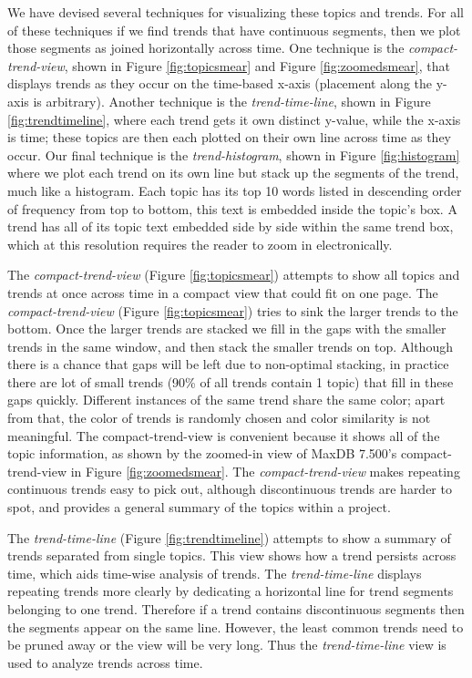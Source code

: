 \documentclass[times, 10pt,twocolumn]{article}
\begin{document}
We have devised several techniques for visualizing these topics and
trends.  For all of these techniques if we find trends that have
continuous segments, then we plot those segments as joined
horizontally across time. One technique is the \emph{compact-trend-view},
shown in Figure \ref{fig:topicsmear} and Figure \ref{fig:zoomedsmear},
that displays trends as they occur on the time-based x-axis
(placement along the y-axis is arbitrary).  Another technique is
the \emph{trend-time-line}, shown in Figure \ref{fig:trendtimeline}, where
each trend gets it own distinct y-value, while the x-axis is time;
these topics are then each plotted on their own line across time as
they occur. Our final technique is the \emph{trend-histogram}, shown in Figure
\ref{fig:histogram} where we plot each trend on its own line but stack
up the segments of the trend, much like a histogram. Each topic has its top 10 words 
listed in descending order of frequency from top to bottom, this text is embedded inside the topic's box.
A trend has all of its topic text embedded side by side within the same trend box, which at this resolution requires the reader to zoom in electronically.


 The \emph{compact-trend-view} (Figure \ref{fig:topicsmear})
  attempts to show all topics and trends at once across time in a
  compact view that could fit on one page.   The
\emph{compact-trend-view} (Figure \ref{fig:topicsmear}) tries to sink
the larger trends to the bottom.  Once the larger trends are stacked
we fill in the gaps with the smaller trends in the same window, and
then stack the smaller trends on top.  Although there is a chance that
gaps will be left due to non-optimal stacking, in practice there are
lot of small trends (90\% of all trends contain 1 topic) that fill in
these gaps quickly.  Different instances of the same trend share the
same color; apart from that, the color of trends is randomly chosen
and color similarity is not meaningful.  The compact-trend-view is
convenient because it shows all of the topic information, as shown by
the zoomed-in view of MaxDB 7.500's compact-trend-view in Figure
\ref{fig:zoomedsmear}. The \emph{compact-trend-view} makes repeating
continuous trends easy to pick out, although discontinuous trends are
harder to spot, and provides a general summary of the topics within a project.

The \emph{trend-time-line} (Figure \ref{fig:trendtimeline})
attempts to show a summary of trends separated from single topics. This view shows how a trend persists across time, which aids time-wise analysis of trends.
The \emph{trend-time-line} displays repeating trends more clearly by
dedicating a horizontal line for trend segments belonging to one
trend. Therefore if a trend contains discontinuous segments then
the segments appear on the same line.  However, the least common
trends need to be pruned away or the view will be very long. 
Thus the \emph{trend-time-line} view is used to analyze trends across time.
\end{document}
